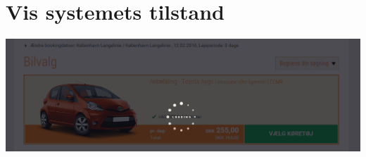 \documentclass[12pt]{article}
\begin{document}

\clearpage\maketitle
\thispagestyle{empty}

\newpage


\thispagestyle{empty}

\pagestyle{plain}
\setcounter{page}{1}

\section{Vis systemets tilstand}
\includegraphics[scale=0.5]{img/Sixt_Loading}
\\
\\
\end{document}
